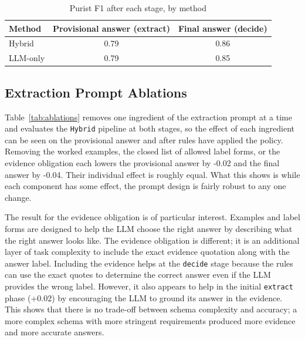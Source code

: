 \documentclass[conference]{IEEEtran}
\begin{document}
\begin{table}[!t]
\caption{Purist F1 after each stage, by method}
\label{tab:stages}
\centering
\begin{tabularx}{\linewidth}{lCC}
\toprule
\textbf{Method} &
\textbf{Provisional answer (extract)} &
\textbf{Final answer (decide)} \\
\midrule
Hybrid & 0.79 & 0.86 \\
LLM-only & 0.79 & 0.85 \\
\bottomrule
\end{tabularx}
\end{table}

\subsection{Extraction Prompt Ablations}
\label{sec:ablations}

Table~\ref{tab:ablations} removes one ingredient of the 
extraction prompt at a time and evaluates the \texttt{Hybrid} 
pipeline at both stages, so the effect of each ingredient can be 
seen on the provisional answer and after rules have applied the 
policy. Removing the worked examples, the closed list of allowed 
label forms, or the evidence obligation each lowers the 
provisional answer by -0.02 and the final answer by 
-0.04. Their individual effect is roughly equal. What this shows
is while each component has some effect, the prompt design is 
fairly robust to any one change. 

The result for the evidence obligation is of particular interest. 
Examples and label forms are designed to help the LLM choose
the right answer by describing what the right answer looks like.
The evidence obligation is different; it is an additional 
layer of task complexity to include the exact evidence
quotation along with the answer label. Including the evidence 
helps at the \texttt{decide} stage because the rules can use 
the exact quotes to determine the correct answer even if the 
LLM provides the wrong label. However, it also appears to help
in the initial \texttt{extract} phase (+0.02) by encouraging the LLM to 
ground its answer in the evidence. This shows that there is no
trade-off between schema complexity and accuracy; a more 
complex schema with more stringent requirements
produced more evidence and more accurate answers.
\end{document}
